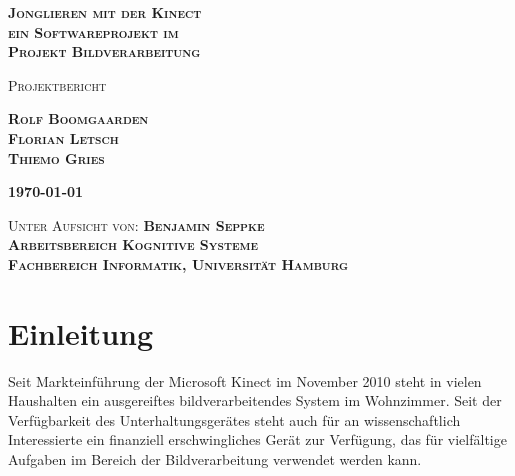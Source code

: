 \documentclass[12pt,a4paper,ngerman]{scrartcl}
\begin{document}
\begin{titlepage}

\vspace*{3 cm}

\begin{flushright}

\bfseries{\Huge\scshape Jonglieren mit der Kinect\\{\Large ein Softwareprojekt im}\\\vspace{0.3cm}Projekt Bildverarbeitung}
\end{flushright}

\vspace{2 cm}

\begin{flushright}
\scshape{\large Projektbericht}
\end{flushright}

\begin{flushright}
\scshape{\LARGE\bfseries Rolf Boomgaarden\\}
\scshape{\LARGE\bfseries Florian Letsch\\}
\scshape{\LARGE\bfseries Thiemo Gries\\}
\end{flushright}

\vspace{2 cm}

\begin{flushright}
\scshape{\large\bfseries \today}
\end{flushright}

\vfill

\begin{flushright}

\scshape{Unter Aufsicht von: {\bfseries Benjamin Seppke}\\}
\scshape{\bfseries Arbeitsbereich Kognitive Systeme\\}
\scshape{\bfseries Fachbereich Informatik, Universität Hamburg\\}
\end{flushright}

\end{titlepage}

\tableofcontents
\newpage

\section{Einleitung}

Seit Markteinführung der Microsoft Kinect im November 2010\cite{kinect:wiki} steht in vielen
Haushalten ein ausgereiftes bildverarbeitendes System im Wohnzimmer. Seit der
Verfügbarkeit des Unterhaltungsgerätes steht auch für an
wissenschaftlich Interessierte ein finanziell erschwingliches Gerät zur Verfügung,
das für vielfältige Aufgaben im Bereich der Bildverarbeitung verwendet werden kann.
\end{document}
